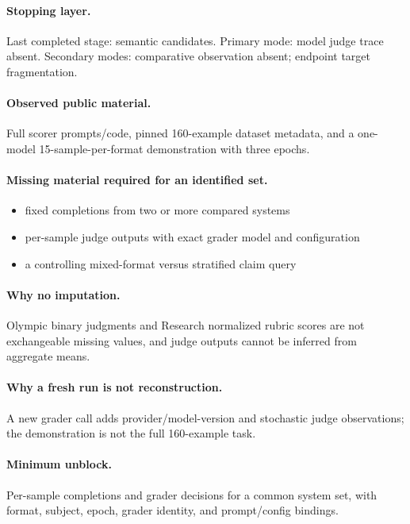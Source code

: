 \paragraph{Stopping layer.} Last completed stage: semantic candidates. Primary mode: model judge trace absent. Secondary modes: comparative observation absent; endpoint target fragmentation.

\paragraph{Observed public material.} Full scorer prompts/code, pinned 160-example dataset metadata, and a one-model 15-sample-per-format demonstration with three epochs.

\paragraph{Missing material required for an identified set.}
\begin{itemize}
  \item fixed completions from two or more compared systems
  \item per-sample judge outputs with exact grader model and configuration
  \item a controlling mixed-format versus stratified claim query
\end{itemize}

\paragraph{Why no imputation.} Olympic binary judgments and Research normalized rubric scores are not exchangeable missing values, and judge outputs cannot be inferred from aggregate means.

\paragraph{Why a fresh run is not reconstruction.} A new grader call adds provider/model-version and stochastic judge observations; the demonstration is not the full 160-example task.

\paragraph{Minimum unblock.} Per-sample completions and grader decisions for a common system set, with format, subject, epoch, grader identity, and prompt/config bindings.

